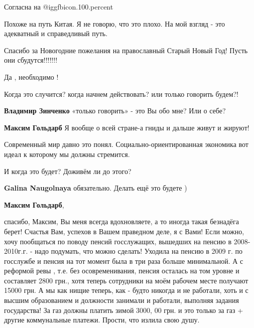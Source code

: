  
 
 
 
 
\zzSecCmt

\begin{itemize} %
Согласна на  @igg{fbicon.100.percent} 

Похоже на путь Китая. Я не говорю, что это плохо. На мой взгляд - это адекватный и справедливый путь.

Спасибо за Новогодние пожелания на православный Старый Новый Год! Пусть они сбудутся!!!!!!!

Да , необходимо !

Когда это случится? когда начнем действовать? или только говорить будем?!

\begin{itemize} %
\textbf{Владимир Зинченко} «только говорить» - это Вы обо мне? Или о себе?

\textbf{Максим Гольдарб} Я вообще о всей стране-а гниды и дальше живут и жируют!
\end{itemize} %

Современный мир давно это понял. Социально-ориентированная экономика вот идеал к которому мы должны стремится.

И когда это будет? Доживём ли до этого?

\begin{itemize} %
\textbf{Galina Naugolnaya} обязательно. Делать ещё это будете )

\textbf{Максим Гольдарб}, 

спасибо, Максим, Вы меня всегда вдохновляете, а то иногда такая безнадёга
берет! Счастья Вам, успехов в Вашем праведном деле, я с Вами! Если можно, хочу
пообщаться по поводу пенсий госслужащих, вышедших на пенсию в 2008-2010г.г. -
надо подумать, что можно сделать! Уходила на пенсию в 2009 г. по госслужбе и
пенсия на тот момент была в три раза больше минимальной. А с реформой ревы ,
т.е. без осовременивания, пенсия осталась на том уровне и составляет 2800 грн.,
хотя теперь сотрудники на моём рабочем месте получают 15000 грн. А мы как нищие
теперь, как - будто никогда и не работали, хоть и с высшим образованием и
должности занимали и работали, выполняя задания государства! За газ должны
платить зимой 3000, 00 грн. и это только за газ + другие коммунальные платежи.
Прости, что излила свою душу.



\end{itemize}
\end{itemize}
